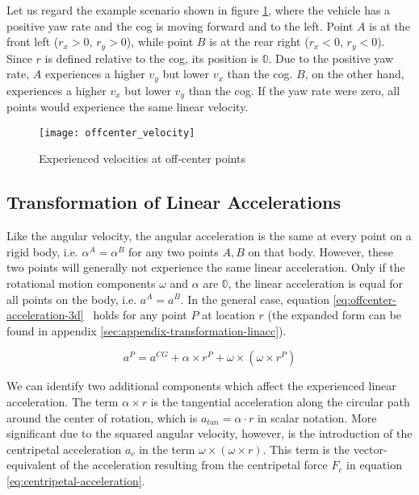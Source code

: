 Let us regard the example scenario shown in figure \ref{fig:offcenter-velocity}, where the vehicle has a positive yaw rate and the \gls{cog} is moving forward and to the left. Point $A$ is at the front left ($r_x > 0$, $r_y > 0$), while point $B$ is at the rear right ($r_x < 0$, $r_y < 0$). Since $r$ is defined relative to the \gls{cog}, its position is $\mathbb{0}$. Due to the positive yaw rate, $A$ experiences a higher $v_y$ but lower $v_x$ than the \gls{cog}. $B$, on the other hand, experiences a higher $v_x$ but lower $v_y$ than the \gls{cog}. If the yaw rate were zero, all points would experience the same linear velocity.

\begin{figure}
	\centering
	\texttt{[image: offcenter\_velocity]}%
	\caption{Experienced velocities at off-center points}
	\label{fig:offcenter-velocity}
\end{figure}


\subsection{Transformation of Linear Accelerations}
Like the angular velocity, the angular acceleration is the same at every point on a rigid body, i.e. $\alpha^A = \alpha^B$ for any two points $A, B$ on that body. However, these two points will generally not experience the same linear acceleration. Only if the rotational motion components $\omega$ and $\alpha$ are $\mathbb{0}$, the linear acceleration is equal for all points on the body, i.e. $a^A = a^B$. In the general case, equation \ref{eq:offcenter-acceleration-3d}~\cite[p.~140]{Gross.2014} holds for any point $P$ at location $r$ (the expanded form can be found in appendix \ref{sec:appendix-transformation-linacc}).

\begin{equation}\label{eq:offcenter-acceleration-3d}%
a^P = a^{CG} + \alpha \times r^P + \omega \times (\omega \times r^P)%
\end{equation}

We can identify two additional components which affect the experienced linear acceleration. The term $\alpha \times r$ is the tangential acceleration along the circular path around the center of rotation, which is $a_{tan} = \alpha \cdot r$ in scalar notation. More significant due to the squared angular velocity, however, is the introduction of the centripetal acceleration $a_c$ in the term $\omega \times (\omega \times r)$. This term is the vector-equivalent of the acceleration resulting from the centripetal force $F_c$ in equation \ref{eq:centripetal-acceleration}.

